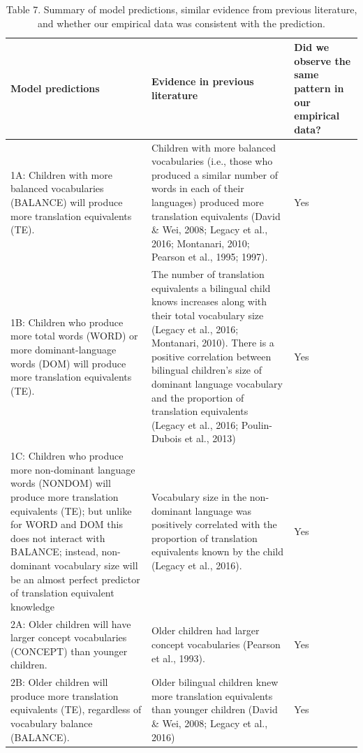\documentclass[
  english,
  ,man,floatsintext]{apa6}
\begin{document}
\begin{landscape}\begin{table}

\caption{\label{tab:table7}Table 7. Summary of model predictions, similar evidence from previous literature, and whether our empirical data was consistent with the prediction.}
\centering
\fontsize{7}{9}\selectfont
\begin{tabular}[t]{>{\raggedright\arraybackslash}p{200px}>{\raggedright\arraybackslash}p{250px}>{\centering\arraybackslash}p{150px}}
\toprule
Model predictions & Evidence in previous literature & Did we observe the same pattern in our empirical data?\\
\midrule
1A: Children with more balanced vocabularies (BALANCE) will produce more translation equivalents (TE). & Children with more balanced vocabularies (i.e., those who produced a similar number of words in each of their languages) produced more translation equivalents (David \& Wei, 2008; Legacy et al., 2016; Montanari, 2010; Pearson et al., 1995; 1997). & Yes\\
1B: Children who produce more total words (WORD) or more dominant-language words (DOM) will produce more translation equivalents (TE). & The number of translation equivalents a bilingual child knows increases along with their total vocabulary size (Legacy et al., 2016; Montanari, 2010). 
 There is a positive correlation between bilingual children’s size of dominant language vocabulary and the proportion of translation equivalents (Legacy et al., 2016; Poulin-Dubois et al., 2013) & Yes\\
1C: Children who produce more non-dominant language words (NONDOM) will produce more translation equivalents (TE); but unlike for WORD and DOM this does not interact with BALANCE; instead, non-dominant vocabulary size will be an almost perfect predictor of translation equivalent knowledge & Vocabulary size in the non-dominant language was positively correlated with the proportion of translation equivalents known by the child (Legacy et al., 2016). & Yes\\
2A: Older children will have larger concept vocabularies (CONCEPT) than younger children. & Older children had larger concept vocabularies (Pearson et al., 1993). & Yes\\
2B: Older children will produce more translation equivalents (TE), regardless of vocabulary balance (BALANCE). & Older bilingual children knew more translation equivalents than younger children  (David \& Wei, 2008; Legacy et al., 2016) & Yes\\

\end{tabular}
\end{table}
\end{landscape}
\end{document}

